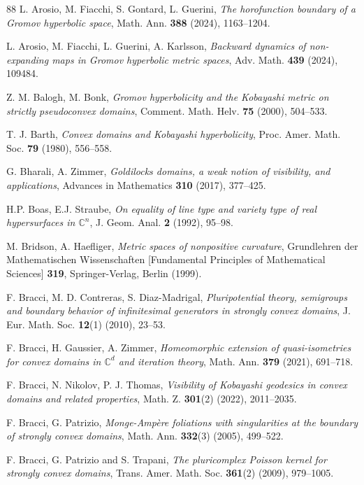 \documentclass[11pt, reqno]{amsart}
\numberwithin{equation}{section}
\theoremstyle{definition}
\newcommand{\C}{\mathbb{C}}
\begin{document}
{{{\begin{thebibliography}{88}
		 L. Arosio, M. Fiacchi, S. Gontard, L. Guerini, {\sl The horofunction boundary of a Gromov hyperbolic space}, Math. Ann. {\bf 388} (2024), 1163--1204.	
		
		 L. Arosio, M. Fiacchi, L. Guerini, A. Karlsson, {\sl Backward dynamics of non-expanding maps in Gromov hyperbolic metric spaces}, Adv. Math. {\bf 439} (2024), 109484.
		
		
		 Z. M. Balogh, M. Bonk, {\sl Gromov hyperbolicity and the Kobayashi metric on strictly pseudoconvex domains}, Comment. Math. Helv. {\bf 75} (2000), 504--533.
		
		 T. J. Barth, {\sl Convex domains and Kobayashi hyperbolicity}, Proc. Amer. Math. Soc. {\bf 79} (1980), 556--558. 
		
		 G. Bharali, A. Zimmer, {\sl Goldilocks domains, a weak notion of visibility, and applications}, Advances in Mathematics {\bf 310} (2017), 377--425.
		
		  H.P. Boas, E.J. Straube, {\sl On equality of line type and variety type of real hypersurfaces in $\C^n$}, J. Geom. Anal. {\bf 2} (1992), 95--98. 
		
		 M. Bridson, A. Haefliger, {\sl Metric spaces of nonpositive curvature}, Grundlehren der Mathematischen Wissenschaften [Fundamental Principles of Mathematical Sciences] {\bf 319}, Springer-Verlag, Berlin (1999).
		
		 F. Bracci, M. D. Contreras, S. Diaz-Madrigal, {\sl Pluripotential theory, semigroups and boundary behavior of infinitesimal generators in strongly convex domains}, J. Eur. Math. Soc. {\bf 12}(1) (2010), 23--53.
		
		 F. Bracci, H. Gaussier, A. Zimmer, {\sl Homeomorphic extension of quasi-isometries for convex domains in $\C^d$ and iteration theory}, Math. Ann. {\bf 379} (2021), 691--718.
		
		 F. Bracci, N. Nikolov, P. J. Thomas, {\sl Visibility of Kobayashi geodesics in convex domains and related properties}, Math. Z. {\bf 301}(2) (2022),  2011--2035.
		
		
		 F. Bracci, G. Patrizio, {\sl Monge-Ampère foliations with singularities at the boundary of strongly convex domains}, Math. Ann. {\bf 332}(3) (2005), 499--522.
		
		  F. Bracci, G. Patrizio and S. Trapani, {\sl The pluricomplex Poisson kernel for strongly convex domains}, Trans. Amer. Math. Soc.  {\bf 361}(2) (2009), 979--1005.
		

\end{thebibliography}}}}
\end{document}
